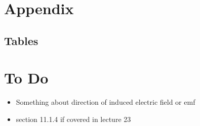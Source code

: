 \documentclass[a4paper,oneside,article]{memoir}
\begin{document}
\chapter{Appendix}
\section*{Tables}

\chapter{To Do}
\begin{itemize}
    \item Something about direction of induced electric field or emf
    \item section 11.1.4 if covered in lecture 23
\end{itemize}
\end{document}
